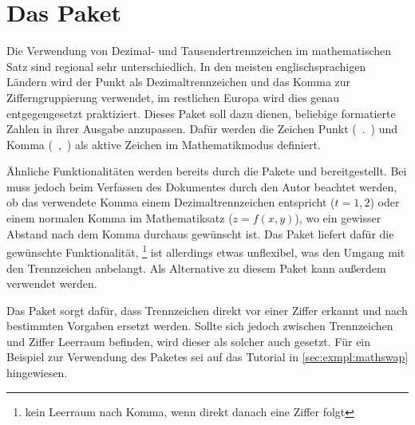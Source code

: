 \section{Das Paket }
\begin{Declaration*}{}
%
%
%
%
Die Verwendung von Dezimal- und Tausendertrennzeichen im mathematischen Satz 
sind regional sehr unterschiedlich. In den meisten englischsprachigen Ländern 
wird der Punkt als Dezimaltrennzeichen und das Komma zur Zifferngruppierung 
verwendet, im restlichen Europa wird dies genau entgegengesetzt praktiziert.
Dieses Paket soll dazu dienen, beliebige formatierte Zahlen in ihrer Ausgabe 
anzupassen. Dafür werden die Zeichen Punkt (\ .\ ) und Komma (\ ,\ ) als 
aktive Zeichen im Mathematikmodus definiert.

Ähnliche Funktionalitäten werden bereits durch die Pakete  und 
 bereitgestellt. Bei  muss jedoch beim
Verfassen des Dokumentes durch den Autor beachtet werden, ob das verwendete
Komma einem Dezimaltrennzeichen entspricht ($t=1,\!2$) oder einem normalen 
Komma im Mathematiksatz ($z=f(x,y)$), wo ein gewisser Abstand nach dem Komma 
durchaus gewünscht ist. Das Paket  liefert dafür die gewünschte 
Funktionalität,%
\footnote{kein Leerraum nach Komma, wenn direkt danach eine Ziffer folgt}
ist allerdings etwas unflexibel, was den Umgang mit den Trennzeichen anbelangt.
Als Alternative zu diesem Paket kann außerdem  verwendet 
werden.

Das Paket  sorgt dafür, dass Trennzeichen direkt vor einer 
Ziffer erkannt und nach bestimmten Vorgaben ersetzt werden. Sollte sich jedoch 
zwischen Trennzeichen und Ziffer Leerraum befinden, wird dieser als solcher
auch gesetzt. Für ein Beispiel zur Verwendung des Paketes sei auf das Tutorial 
 in \autoref{sec:exmpl:mathswap} hingewiesen.


\end{Declaration*}
